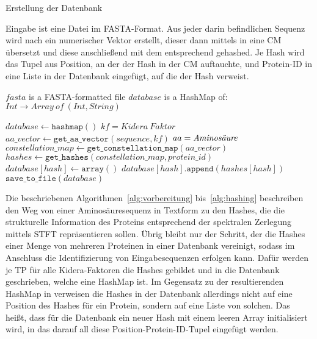         \begin{algorithm}[H]
            \caption{Erstellung der Datenbank}\label{alg:datenbank}
            Eingabe ist eine Datei im FASTA-Format. Aus jeder darin befindlichen Sequenz wird nach  ein numerischer Vektor erstellt, dieser dann mittels  in eine \acl{CM} übersetzt und diese anschließend mit dem  entsprechend gehashed. Je Hash wird das Tupel aus Position, an der der Hash in der \acl{CM} auftauchte, und Protein-ID in eine Liste in der Datenbank eingefügt, auf die der Hash verweist.
            \begin{algorithmic}[1]
                \Require $fasta$ is a FASTA-formatted file
                \Ensure $database$ is a HashMap of: $Int \rightarrow Array\ of\ (Int, String)$

                \State $database \gets \texttt{hashmap}()$
                     \Comment $kf=Kidera\ Faktor$
                        \State $aa\_vector \gets \texttt{get\_aa\_vector}(sequence, kf)$ \Comment $aa = \emph{Aminosäure}$
                        \State $constellation\_map \gets \texttt{get\_constellation\_map}(aa\_vector)$
                        \State $hashes \gets \texttt{get\_hashes}(constellation\_map, protein\_id)$
                                \State $database[hash] \gets \texttt{array}()$
                            \EndIf
                            \State $database[hash].\texttt{append}(hashes[hash])$
                        \EndFor
                    \EndFor
                \EndFor
                \State $\texttt{save\_to\_file}(database)$
            \end{algorithmic}
        \end{algorithm}

        Die beschriebenen Algorithmen~\ref{alg:vorbereitung} bis~\ref{alg:hashing} beschreiben den Weg von einer Aminosäuresequenz in Textform zu den Hashes, die die strukturelle Information des Proteins entsprechend der spektralen Zerlegung mittels \ac{STFT} repräsentieren sollen. Übrig bleibt nur der Schritt, der die Hashes einer Menge von mehreren Proteinen in einer Datenbank vereinigt, sodass im Anschluss die Identifizierung von Eingabesequenzen erfolgen kann. Dafür werden je \ac{TP} für alle Kidera-Faktoren die Hashes gebildet und in die Datenbank geschrieben, welche eine HashMap ist. Im Gegensatz zu der resultierenden HashMap in  verweisen die Hashes in der Datenbank allerdings nicht auf eine Position des Hashes für ein Protein, sondern auf eine Liste von solchen. Das heißt, dass für die Datenbank ein neuer Hash mit einem leeren Array initialisiert wird, in das darauf all diese Position-Protein-ID-Tupel eingefügt werden.

